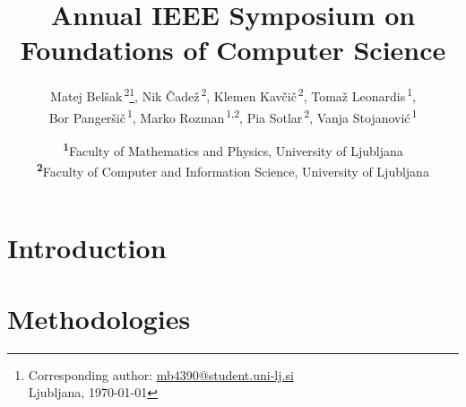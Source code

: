 \documentclass[
	a4paper, %
	10pt, %
	unnumberedsections, %
	twoside, %
]{LTJournalArticle}
\title{Annual IEEE Symposium on Foundations of Computer Science} %
\author{%
	Matej Bel\v sak\textsuperscript{\,2}\thanks{Corresponding author: \href{mailto:mb4390@student.uni-lj.si}{mb4390@student.uni-lj.si}\\ Ljubljana, \monthyeardate\today  }, 
	Nik \v Cade\v z\textsuperscript{\,2},
	Klemen Kav\v ci\v c\textsuperscript{\,2}, 
	Toma\v z Leonardis\textsuperscript{\,1},\\
	Bor Panger\v si\v c\textsuperscript{\,1}, 
	Marko Rozman\textsuperscript{\,1,2}, 
	Pia Sotlar\textsuperscript{\,2}, 
	Vanja Stojanovi\' c\textsuperscript{\,1}
}
\date{
	\footnotesize\textsuperscript{\textbf{1}}Faculty of Mathematics and Physics, University of Ljubljana\\
	\textsuperscript{\textbf{2}}Faculty of Computer and Information Science, University of Ljubljana
}
\begin{document}
\maketitle %


\section{Introduction}



\section{Methodologies}







\printbibliography %

\end{document}
